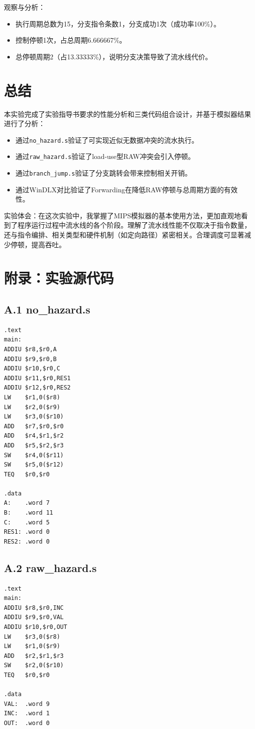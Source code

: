 \documentclass[12pt,a4paper]{ctexart}
\begin{document}
观察与分析：
\begin{itemize}
	\item 执行周期总数为15，分支指令条数1，分支成功1次（成功率100\%）。
	\item 控制停顿1次，占总周期6.666667\%。
	\item 总停顿周期2（占13.33333\%），说明分支决策导致了流水线代价。
\end{itemize}

\section{总结}
本实验完成了实验指导书要求的性能分析和三类代码组合设计，并基于模拟器结果进行了分析：
\begin{itemize}
	\item 通过\texttt{no\_hazard.s}验证了可实现近似无数据冲突的流水执行。
	\item 通过\texttt{raw\_hazard.s}验证了load-use型RAW冲突会引入停顿。
	\item 通过\texttt{branch\_jump.s}验证了分支跳转会带来控制相关开销。
	\item 通过WinDLX对比验证了Forwarding在降低RAW停顿与总周期方面的有效性。
\end{itemize}

实验体会：在这次实验中，我掌握了MIPS模拟器的基本使用方法，更加直观地看到了程序运行过程中流水线的各个阶段。理解了流水线性能不仅取决于指令数量，还与指令编排、相关类型和硬件机制（如定向路径）紧密相关。合理调度可显著减少停顿，提高吞吐。

\section*{附录：实验源代码}
\subsection*{A.1 no\_hazard.s}
\begin{lstlisting}
.text
main:
ADDIU $r8,$r0,A
ADDIU $r9,$r0,B
ADDIU $r10,$r0,C
ADDIU $r11,$r0,RES1
ADDIU $r12,$r0,RES2
LW    $r1,0($r8)
LW    $r2,0($r9)
LW    $r3,0($r10)
ADD   $r7,$r0,$r0
ADD   $r4,$r1,$r2
ADD   $r5,$r2,$r3
SW    $r4,0($r11)
SW    $r5,0($r12)
TEQ   $r0,$r0

.data
A:    .word 7
B:    .word 11
C:    .word 5
RES1: .word 0
RES2: .word 0
\end{lstlisting}

\subsection*{A.2 raw\_hazard.s}
\begin{lstlisting}
.text
main:
ADDIU $r8,$r0,INC
ADDIU $r9,$r0,VAL
ADDIU $r10,$r0,OUT
LW    $r3,0($r8)
LW    $r1,0($r9)
ADD   $r2,$r1,$r3
SW    $r2,0($r10)
TEQ   $r0,$r0

.data
VAL:  .word 9
INC:  .word 1
OUT:  .word 0
\end{lstlisting}
\end{document}
